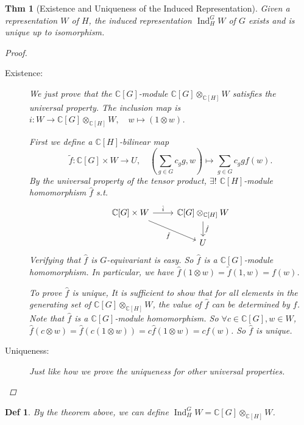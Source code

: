 \documentclass[a4paper]{article}
\newcommand*{\Cb}{\mathbb{C}}
\DeclareMathOperator{\Ind}{Ind}
\theoremstyle{mystyle}
\newtheorem{theorem}{Thm}
\newtheorem{definition}{Def}
\begin{document}
\begin{theorem}[Existence and Uniqueness of the Induced Representation]
  Given a representation $W$ of $H$, the induced representation
  $\Ind^G_H W$ of $G$ exists and is unique up to isomorphism.
  \begin{proof}
    \begin{description}
      \item[Existence:]
        We just prove that the $\Cb[G]$-module $\Cb[G] \otimes_{\Cb[H]} W$
        satisfies the universal property.
        The inclusion map is $i: W \to \Cb[G]\otimes_{\Cb[H]} W,
        \quad w \mapsto (1\otimes w)$.
        
        First we define a $\Cb[H]$-bilinear map
        \[
          \tilde{f}: \Cb[G] \times W \to U, \quad
          \left(\sum_{g\in G} c_g g, w\right) \mapsto
          \sum_{g\in G} c_g gf(w).
        \]
        By the universal property of the tensor product, $\exists!$
        $\Cb[H]$-module homomorphism $\hat{f}$ s.t.
        \[
          \begin{tikzcd}
            \Cb[G] \times W \arrow[r, "\hat{i}"] \arrow[dr, "\tilde{f}"']
            & \Cb[G]\otimes_{\Cb[H]}W \arrow[d, "\hat{f}"] \\
            & U
          \end{tikzcd}
        \]
        Verifying that $\hat{f}$ is $G$-equivariant is easy.
        So $\hat{f}$ is a $\Cb[G]$-module homomorphism.
        In particular, we have $\hat{f}(1 \otimes w) = \tilde{f}(1, w) = f(w)$.
        
        To prove $\hat{f}$ is unique, It is sufficient to show that for all
        elements in the generating set of $\Cb[G] \otimes_{\Cb[H]} W$,
        the value of $\hat{f}$ can be determined by $f$.
        Note that $\hat{f}$ is a $\Cb[G]$-module homomorphism. So
        $\forall c \in \Cb[G], w\in W$, $\hat{f}(c \otimes w)
        = \hat{f}(c (1\otimes w)) = c\hat{f}(1\otimes w) = cf(w)$.
        So $\hat{f}$ is unique.
      \item[Uniqueness:] Just like how we prove the uniqueness for
        other universal properties.
        \qedhere
    \end{description}
  \end{proof}
\end{theorem}

\begin{definition}
  By the theorem above, we can define $\Ind^G_H W = \Cb[G] \otimes_{\Cb[H]} W$.
\end{definition}
\end{document}
